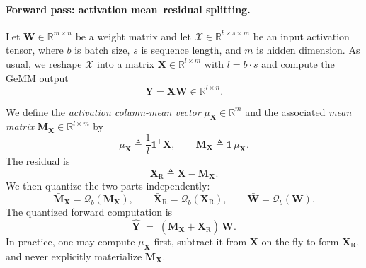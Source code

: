\paragraph{Forward pass: activation mean--residual splitting.}
Let $\mathbf{W}\in\mathbb{R}^{m\times n}$ be a weight matrix and let
$\mathcal{X}\in\mathbb{R}^{b\times s\times m}$ be an input activation tensor, where $b$ is batch size,
$s$ is sequence length, and $m$ is hidden dimension.
As usual, we reshape $\mathcal{X}$ into a matrix $\mathbf{X}\in\mathbb{R}^{l\times m}$ with $l=b\cdot s$
and compute the GeMM output
\[
\mathbf{Y}=\mathbf{X}\mathbf{W}\in\mathbb{R}^{l\times n}.
\]

We define the \emph{activation column-mean vector} $\mu_{\mathbf{X}}\in\mathbb{R}^{m}$ and the associated
\emph{mean matrix} $\mathbf{M}_{\mathbf{X}}\in\mathbb{R}^{l\times m}$ by
\[
\mu_{\mathbf{X}} \triangleq \frac{1}{l}\mathbf{1}^{\top}\mathbf{X},
\qquad
\mathbf{M}_{\mathbf{X}} \triangleq \mathbf{1}\,\mu_{\mathbf{X}}.
\]
The residual is
\[
\mathbf{X}_{\mathrm{R}} \triangleq \mathbf{X}-\mathbf{M}_{\mathbf{X}}.
\]
We then quantize the two parts independently:
\[
\bar{\mathbf{M}}_{\mathbf{X}}=\mathcal{Q}_b(\mathbf{M}_{\mathbf{X}}),
\qquad
\bar{\mathbf{X}}_{\mathrm{R}}=\mathcal{Q}_b(\mathbf{X}_{\mathrm{R}}),
\qquad
\bar{\mathbf{W}}=\mathcal{Q}_b(\mathbf{W}).
\]
The quantized forward computation is
\begin{equation}
\label{eq:averis_forward}
\hat{\mathbf{Y}}
\;=\;
(\bar{\mathbf{M}}_{\mathbf{X}}+\bar{\mathbf{X}}_{\mathrm{R}})\,\bar{\mathbf{W}}.
\end{equation}
In practice, one may compute $\mu_{\mathbf{X}}$ first, subtract it from $\mathbf{X}$ on the fly to form
$\mathbf{X}_{\mathrm{R}}$, and never explicitly materialize $\mathbf{M}_{\mathbf{X}}$.

